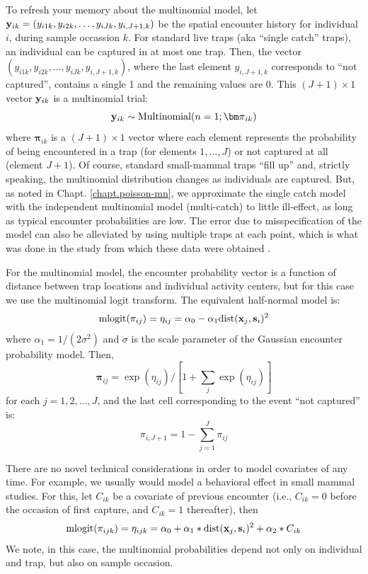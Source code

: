 To refresh your memory about the multinomial model, let ${\bf y}_{ik}
= (y_{i1k},y_{i2k},\ldots,y_{iJk},y_{i,J+1,k})$ be the spatial encounter history
for individual $i$, during sample occassion $k$.  
 For standard live traps (aka
``single catch'' traps), an individual can be captured in at most one
trap. Then, the vector $(y_{i1k},y_{i2k},\ldots,y_{iJk},y_{i,J+1,k})$,
where the last element $y_{i,J+1,k}$ corresponds to ``not captured'',
contains a single 1 and the remaining values are 0.  This $(J+1)\times
1$ vector ${\bf y}_{ik}$ is a multinomial trial:
\[
{\bf y}_{ik} \sim \mbox{Multinomial}(n=1; {\bm \pi}_{ik} )
\]
where ${\bm \pi}_{ik}$ is a $(J+1) \times 1$ vector where each element
represents the probability of being encountered in a trap (for
elements $1,\ldots,J$) or not captured at all (element $J+1$). Of
course, standard small-mammal traps ``fill up'' and, strictly
speaking, the multinomial distribution changes as individuals are
captured. But, as noted in Chapt. \ref{chapt.poisson-mn}, we
approximate the single catch model with the independent multinomial
model (multi-catch) to little ill-effect, as long as typical encounter
probabilities are low. The error due to misspecification of the model
can also be alleviated by using multiple traps at each point, which is
what was done in the study from which these data were obtained
\citep{converse_etal:2006ecol, converse_etal:2006jwm}.

For the multinomial model, the encounter probability vector is a
function of distance between trap locations and individual activity
centers, but for this case we use the multinomial logit transform. The
equivalent half-normal model is:
\begin{equation}
\mbox{mlogit}(\pi_{ij}) = \eta_{ij}  =  \alpha_0 - \alpha_{1} \mbox{dist}({\bf x}_{j},{\bf s}_{i})^2   
\label{hscr.eq.mlogit}
\end{equation}
where $\alpha_{1} = 1/(2\sigma^2)$ and $\sigma$ is the scale
parameter of the Gaussian encounter probability model. Then, 
\[
{\bm \pi}_{ij} = \exp(\eta_{ij})/[ 1 + \sum_{j} \exp(\eta_{ij}) ]
\]
for each $j=1,2,\ldots,J$, and the last cell corresponding to the
event ``not captured'' is:
\[
\pi_{i,J+1} = 1- \sum_{j=1}^{J} \pi_{ij}
\]

There are no novel technical considerations in order to model
covariates of any time. 
For example, we usually would model a behavioral
effect in small mammal studies. For this, let
$C_{ik}$ be a covariate of previous encounter
(i.e., $C_{ik} = 0$ before the occasion of first capture, and $C_{ik}
= 1$ thereafter), then
\[
\mbox{mlogit}(\pi_{ijk}) = \eta_{ijk} = \alpha_{0}  +\alpha_{1}*\mbox{dist}({\bf  x}_{j},{\bf s}_{i})^2 +  \alpha_{2}*C_{ik}
\]
We note, in this case, the multinomial probabilities depend not only
on individual and trap, but also on sample occasion.

